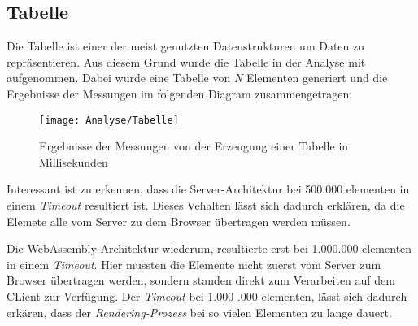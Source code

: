 \subsection{Tabelle}
\label{subsec:table}
Die Tabelle ist einer der meist genutzten Datenstrukturen um Daten zu repräsentieren. Aus diesem
Grund wurde die Tabelle in der Analyse mit aufgenommen. Dabei wurde eine Tabelle von
\emph{N} Elementen generiert und die Ergebnisse der Messungen im folgenden Diagram zusammengetragen:

\begin{figure}[h]
    \centering
    \texttt{[image: Analyse/Tabelle]}
    \caption[Ergebnisse der Messungen von der Erzeugung einer Tabelle in Millisekunden]{Ergebnisse
    der Messungen von der Erzeugung einer Tabelle in Millisekunden}
    \label{img:table}
\end{figure}

Interessant ist zu erkennen, dass die Server-Architektur bei 500.000 elementen in einem
\emph{Timeout} resultiert ist. Dieses Vehalten lässt sich dadurch erklären, da die Elemete
alle vom Server zu dem Browser übertragen werden müssen.

Die WebAssembly-Architektur wiederum, resultierte erst bei 1.000.000 elementen in einem
\emph{Timeout}. Hier mussten die Elemente nicht zuerst vom Server zum Browser übertragen werden,
sondern standen direkt zum Verarbeiten auf dem CLient zur Verfügung. Der \emph{Timeout} bei 1.000
.000 elementen, lässt sich dadurch erkären, dass der \emph{Rendering-Prozess} bei so vielen
Elementen zu lange dauert.
